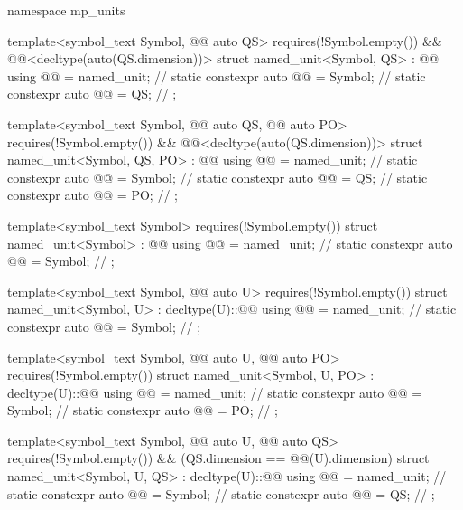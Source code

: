 \begin{codeblock}
namespace mp_units {

template<symbol_text Symbol, @@ auto QS>
  requires(!Symbol.empty()) && @@<decltype(auto(QS.dimension))>
struct named_unit<Symbol, QS> : @@ {
  using @@ = named_unit;              // \expos
  static constexpr auto @@ = Symbol;     // \expos
  static constexpr auto @@ = QS;  // \expos
};

template<symbol_text Symbol, @@ auto QS, @@ auto PO>
  requires(!Symbol.empty()) && @@<decltype(auto(QS.dimension))>
struct named_unit<Symbol, QS, PO> : @@ {
  using @@ = named_unit;              // \expos
  static constexpr auto @@ = Symbol;     // \expos
  static constexpr auto @@ = QS;  // \expos
  static constexpr auto @@ = PO;   // \expos
};

template<symbol_text Symbol>
  requires(!Symbol.empty())
struct named_unit<Symbol> : @@ {
  using @@ = named_unit;              // \expos
  static constexpr auto @@ = Symbol;     // \expos
};

template<symbol_text Symbol, @@ auto U>
  requires(!Symbol.empty())
struct named_unit<Symbol, U> : decltype(U)::@@ {
  using @@ = named_unit;              // \expos
  static constexpr auto @@ = Symbol;     // \expos
};

template<symbol_text Symbol, @@ auto U, @@ auto PO>
  requires(!Symbol.empty())
struct named_unit<Symbol, U, PO> : decltype(U)::@@ {
  using @@ = named_unit;              // \expos
  static constexpr auto @@ = Symbol;     // \expos
  static constexpr auto @@ = PO;   // \expos
};

template<symbol_text Symbol, @@ auto U, @@ auto QS>
  requires(!Symbol.empty()) && (QS.dimension == @@(U).dimension)
struct named_unit<Symbol, U, QS> : decltype(U)::@@ {
  using @@ = named_unit;              // \expos
  static constexpr auto @@ = Symbol;     // \expos
  static constexpr auto @@ = QS;  // \expos
};

}
\end{codeblock}
